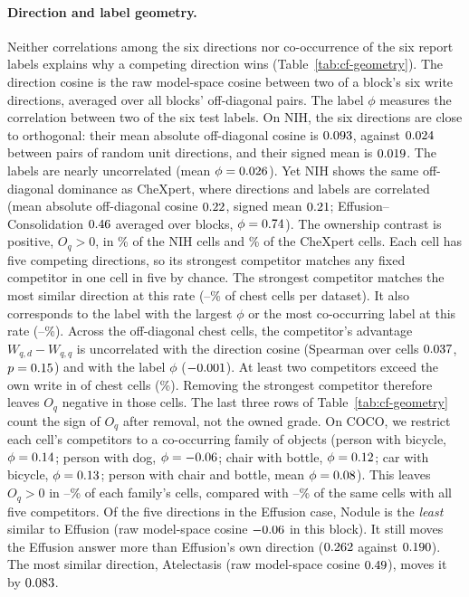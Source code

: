 \documentclass{article}
\begin{document}
\paragraph{Direction and label geometry.} Neither correlations among the six directions nor co-occurrence of the six report labels explains why a competing direction wins (Table~\ref{tab:cf-geometry}). The direction cosine is the raw model-space cosine between two of a block's six write directions, averaged over all blocks' off-diagonal pairs. The label $\phi$ measures the correlation between two of the six test labels. On NIH, the six directions are close to orthogonal: their mean absolute off-diagonal cosine is $0.093$, against $0.024$ between pairs of random unit directions, and their signed mean is $0.019$. The labels are nearly uncorrelated (mean $\phi=0.026$). Yet NIH shows the same off-diagonal dominance as CheXpert, where directions and labels are correlated (mean absolute off-diagonal cosine $0.22$, signed mean $0.21$; Effusion--Consolidation $0.46$ averaged over blocks, $\phi=0.74$). The ownership contrast is positive, $O_q>0$, in \cfGeoOwnWinsNihPct\% of the \cfNihCells{} NIH cells and \cfGeoOwnWinsChexPct\% of the \cfChexCells{} CheXpert cells. Each cell has five competing directions, so its strongest competitor matches any fixed competitor in one cell in five by chance. The strongest competitor matches the most similar direction at this rate (\cfGeoChanceCosMin{}--\cfGeoChanceCosMax\% of chest cells per dataset). It also corresponds to the label with the largest $\phi$ or the most co-occurring label at this rate (\cfGeoChanceLabelMin{}--\cfGeoChanceLabelMax\%). Across the \cfGeoOffdiagCells{} off-diagonal chest cells, the competitor's advantage $W_{q,d}-W_{q,q}$ is uncorrelated with the direction cosine (Spearman over cells $0.037$, $p=0.15$) and with the label $\phi$ ($-0.001$). At least two competitors exceed the own write in \cfGeoTwoAbove{} of \cfGeoTwoAboveN{} chest cells (\cfGeoTwoAbovePct\%). Removing the strongest competitor therefore leaves $O_q$ negative in those cells. The last three rows of Table~\ref{tab:cf-geometry} count the sign of $O_q$ after removal, not the owned grade. On COCO, we restrict each cell's competitors to a co-occurring family of objects (person with bicycle, $\phi=0.14$; person with dog, $\phi=-0.06$; chair with bottle, $\phi=0.12$; car with bicycle, $\phi=0.13$; person with chair and bottle, mean $\phi=0.08$). This leaves $O_q>0$ in \cfGeoCocoFamMinPct{}--\cfGeoCocoFamMaxPct\% of each family's cells, compared with \cfGeoCocoFamFullMinPct{}--\cfGeoCocoFamFullMaxPct\% of the same cells with all five competitors. Of the five directions in the Effusion case, Nodule is the \emph{least} similar to Effusion (raw model-space cosine $-0.06$ in this block). It still moves the Effusion answer more than Effusion's own direction ($0.262$ against $0.190$). The most similar direction, Atelectasis (raw model-space cosine $0.49$), moves it by $0.083$.
\end{document}
